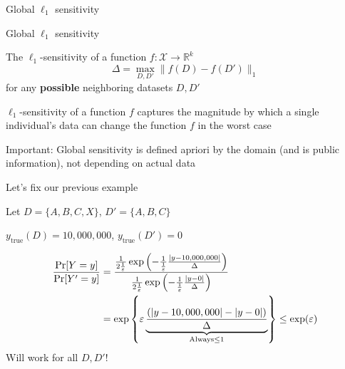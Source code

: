 \documentclass[12pt,aspectratio=169,handout]{beamer}
\begin{document}
\begin{frame}{Global $\ell_1$ sensitivity}

\begin{block}{Global $\ell_1$ sensitivity}

The $\ell_1$-sensitivity of a function $f : \mathcal{X} \rightarrow \mathbb{R}^k$
$$\Delta = \max_{D, D'} \| f(D) - f(D') \|_1$$
for any \textbf{possible} neighboring datasets $D, D'$
\end{block}

$\ell_1$-sensitivity of a function $f$ captures the magnitude by which a single individual’s data can change the function $f$ in the worst case

Important: Global sensitivity is defined apriori by the domain (and is public information), not depending on actual data



\end{frame}



\begin{frame}{Let's fix our previous example}

Let $D = \{A, B, C, X\}$, $D' = \{A, B, C\}$

$y_{\mathrm{true}}(D) = 10,000,000$, $y_{\mathrm{true}}(D') = 0$


$$
\begin{aligned}
\frac{\Pr[Y = y]}{\Pr[Y' = y]} &=
\frac{
\frac{1}{2\frac{1}{\varepsilon}} \exp \left(- \frac{1}{\frac{1}{\varepsilon}}
\frac{
\abs{y - 10,000,000}
}{\Delta}
\right)
}{
\frac{1}{2\frac{1}{\varepsilon}} \exp \left(- \frac{1}{\frac{1}{\varepsilon}}
\frac{
\abs{y - 0}
}{\Delta}
\right) 
} \\
&=
\exp \left\{ \varepsilon
\underbrace{
\frac{
\left( \abs{y - 10,000,000} - \abs{y - 0} \right)
}{\Delta}
}_{\text{Always} \leq 1}
\right\}  \leq \exp(\varepsilon) \\
\end{aligned}
$$
Will work for all $D, D'$!
\end{frame}
\end{document}
